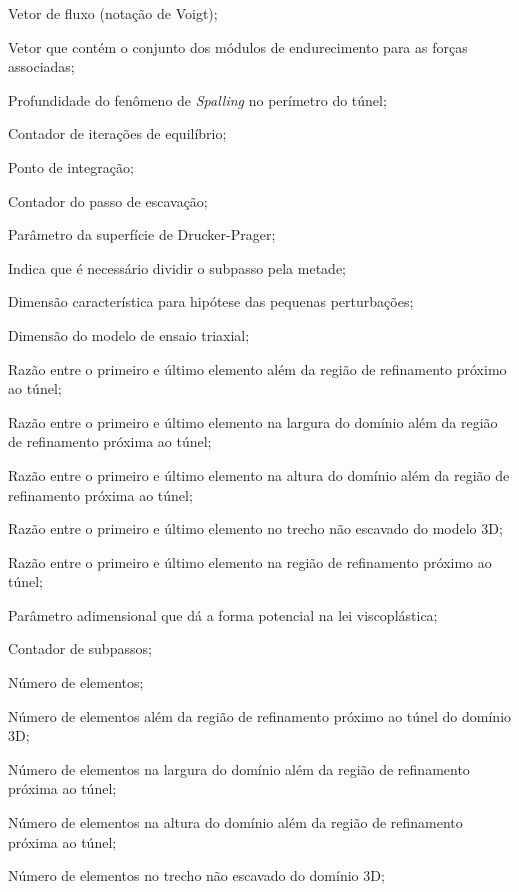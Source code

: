 \item[$\dgdsl$]			Vetor de fluxo (notação de Voigt);
\item[$\hl$]			Vetor que contém o conjunto dos módulos de endurecimento para as forças associadas;
\item[$h_s$]			Profundidade do fenômeno de \textit{Spalling} no perímetro do túnel;
\item[$i$] 				Contador de iterações de equilíbrio;
\item[$i_p$]			Ponto de integração;
\item[$i_p$]			Contador do passo de escavação;
\item[$k$] 				Parâmetro da superfície de Drucker-Prager;
\item[$k_{cut}$] 		Indica que é necessário dividir o subpasso pela metade;
\item[$l_0$] 			Dimensão característica para hipótese das pequenas perturbações;
\item[$l_a,~l_b,~l_c$] 			Dimensão do modelo de ensaio triaxial;
\item[$mL_{1}$] 				Razão entre o primeiro e último elemento além da região de refinamento próximo ao túnel;
\item[$mL_{x_1}$] 				Razão entre o primeiro e último elemento na largura do domínio além da região de refinamento próxima ao túnel;
\item[$mL_{y_2}$] 				Razão entre o primeiro e último elemento na altura do domínio além da região de refinamento próxima ao túnel;
\item[$mL_{z_2}$] 				Razão entre o primeiro e último elemento no trecho não escavado do modelo 3D;
\item[$mR_{1}$] 				Razão entre o primeiro e último elemento na região de refinamento próximo ao túnel;
\item[$n$] 				Parâmetro adimensional que dá a forma potencial na lei viscoplástica;
\item[$n$] 				Contador de subpassos;
\item[$n_e$] 				Número de elementos;
\item[$nL_{1}$] 				Número de elementos além da região de refinamento próximo ao túnel do domínio 3D;
\item[$nL_{x_1}$] 				Número de elementos na largura do domínio além da região de refinamento próxima ao túnel;
\item[$nL_{y_2}$] 				Número de elementos na altura do domínio além da região de refinamento próxima ao túnel;
\item[$nL_{z_2}$] 				Número de elementos no trecho não escavado do domínio 3D;
